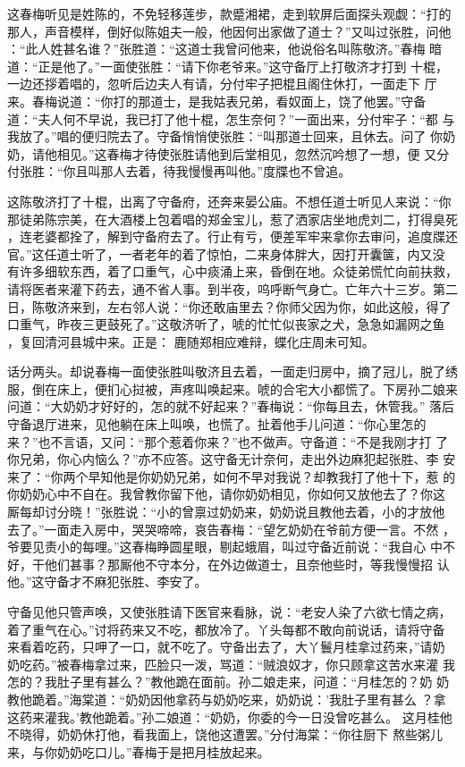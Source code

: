 这春梅听见是姓陈的，不免轻移莲步，款蹙湘裙，走到软屏后面探头观觑：“打的
那人，声音模样，倒好似陈姐夫一般，他因何出家做了道士？”又叫过张胜，问他
：“此人姓甚名谁？”张胜道：“这道士我曾问他来，他说俗名叫陈敬济。”春梅
暗道：“正是他了。”一面使张胜：“请下你老爷来。”这守备厅上打敬济才打到
十棍，一边还拶着唱的，忽听后边夫人有请，分付牢子把棍且阁住休打，一面走下
厅来。春梅说道：“你打的那道士，是我姑表兄弟，看奴面上，饶了他罢。”守备
道：“夫人何不早说，我已打了他十棍，怎生奈何？”一面出来，分付牢子：“都
与我放了。”唱的便归院去了。守备悄悄使张胜：“叫那道士回来，且休去。问了
你奶奶，请他相见。”这春梅才待使张胜请他到后堂相见，忽然沉吟想了一想，便
又分付张胜：“你且叫那人去着，待我慢慢再叫他。”度牒也不曾追。

这陈敬济打了十棍，出离了守备府，还奔来晏公庙。不想任道士听见人来说：“你
那徒弟陈宗美，在大酒楼上包着唱的郑金宝儿，惹了洒家店坐地虎刘二，打得臭死
，连老婆都拴了，解到守备府去了。行止有亏，便差军牢来拿你去审问，追度牒还
官。”这任道士听了，一者老年的着了惊怕，二来身体胖大，因打开囊箧，内又没
有许多细软东西，着了口重气，心中痰涌上来，昏倒在地。众徒弟慌忙向前扶救，
请将医者来灌下药去，通不省人事。到半夜，呜呼断气身亡。亡年六十三岁。第二
日，陈敬济来到，左右邻人说：“你还敢庙里去？你师父因为你，如此这般，得了
口重气，昨夜三更鼓死了。”这敬济听了，唬的忙忙似丧家之犬，急急如漏网之鱼
，复回清河县城中来。正是：
鹿随郑相应难辩，蝶化庄周未可知。

话分两头。却说春梅一面使张胜叫敬济且去着，一面走归房中，摘了冠儿，脱了绣
服，倒在床上，便扪心挝被，声疼叫唤起来。唬的合宅大小都慌了。下房孙二娘来
问道：“大奶奶才好好的，怎的就不好起来？”春梅说：“你每且去，休管我。”
落后守备退厅进来，见他躺在床上叫唤，也慌了。扯着他手儿问道：“你心里怎的
来？”也不言语，又问：“那个惹着你来？”也不做声。守备道：“不是我刚才打
了你兄弟，你心内恼么？”亦不应答。这守备无计奈何，走出外边麻犯起张胜、李
安来了：“你两个早知他是你奶奶兄弟，如何不早对我说？却教我打了他十下，惹
的你奶奶心中不自在。我曾教你留下他，请你奶奶相见，你如何又放他去了？你这
厮每却讨分晓！”张胜说：“小的曾禀过奶奶来，奶奶说且教他去着，小的才放他
去了。”一面走入房中，哭哭啼啼，哀告春梅：“望乞奶奶在爷前方便一言。不然
，爷要见责小的每哩。”这春梅睁圆星眼，剔起蛾眉，叫过守备近前说：“我自心
中不好，干他们甚事？那厮他不守本分，在外边做道士，且奈他些时，等我慢慢招
认他。”这守备才不麻犯张胜、李安了。

守备见他只管声唤，又使张胜请下医官来看脉，说：“老安人染了六欲七情之病，
着了重气在心。”讨将药来又不吃，都放冷了。丫头每都不敢向前说话，请将守备
来看着吃药，只呷了一口，就不吃了。守备出去了，大丫鬟月桂拿过药来，”请奶
奶吃药。”被春梅拿过来，匹脸只一泼，骂道：“贼浪奴才，你只顾拿这苦水来灌
我怎的？我肚子里有甚么？”教他跪在面前。孙二娘走来，问道：“月桂怎的？奶
奶教他跪着。”海棠道：“奶奶因他拿药与奶奶吃来，奶奶说：'我肚子里有甚么
？拿这药来灌我。'教他跪着。”孙二娘道：“奶奶，你委的今一日没曾吃甚么。
这月桂他不晓得，奶奶休打他，看我面上，饶他这遭罢。”分付海棠：“你往厨下
熬些粥儿来，与你奶奶吃口儿。”春梅于是把月桂放起来。

